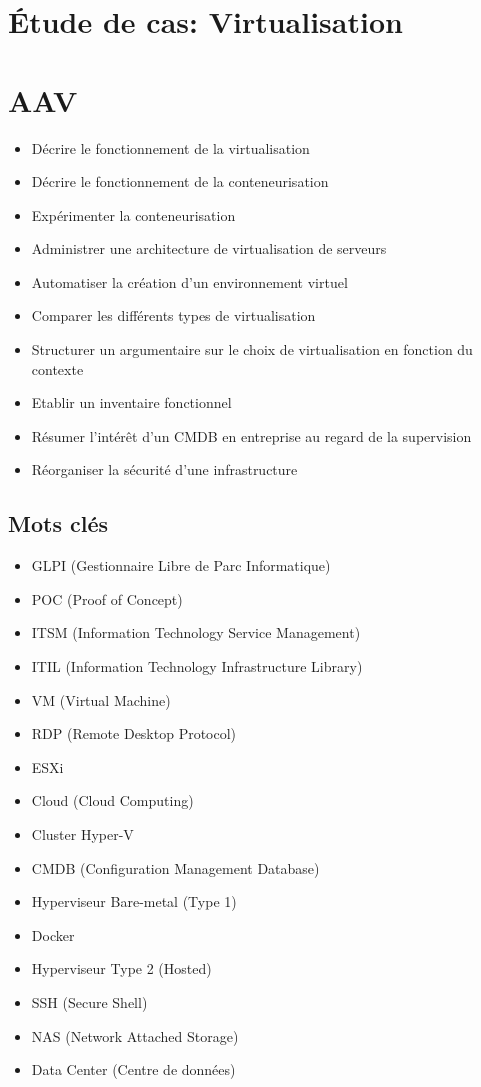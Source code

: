 \section*{Étude de cas: Virtualisation}

\section*{AAV}
\begin{itemize}
  \item [2] Décrire le fonctionnement de la virtualisation
  \item [2] Décrire le fonctionnement de la conteneurisation
  \item [3] Expérimenter la conteneurisation
  \item [3] Administrer une architecture de virtualisation de serveurs
  \item [3] Automatiser la création d'un environnement virtuel
  \item [4] Comparer les différents types de virtualisation
  \item [5] Structurer un argumentaire sur le choix de virtualisation en fonction du contexte
  \item [3] Etablir un inventaire fonctionnel
  \item [2] Résumer l'intérêt d'un CMDB en entreprise au regard de la supervision
  \item [5] Réorganiser la sécurité d'une infrastructure
\end{itemize}

\subsection*{Mots clés}
{}
\begin{itemize}
  \item GLPI (Gestionnaire Libre de Parc Informatique)
  \item POC (Proof of Concept)
  \item ITSM (Information Technology Service Management)
  \item ITIL (Information Technology Infrastructure Library)
  \item VM (Virtual Machine)
  \item RDP (Remote Desktop Protocol)
  \item ESXi
  \item Cloud (Cloud Computing)
  \item Cluster Hyper-V
  \item CMDB (Configuration Management Database)
  \item Hyperviseur Bare-metal (Type 1)
  \item Docker
  \item Hyperviseur Type 2 (Hosted)
  \item SSH (Secure Shell)
  \item NAS (Network Attached Storage)
  \item Data Center (Centre de données)
\end{itemize}

